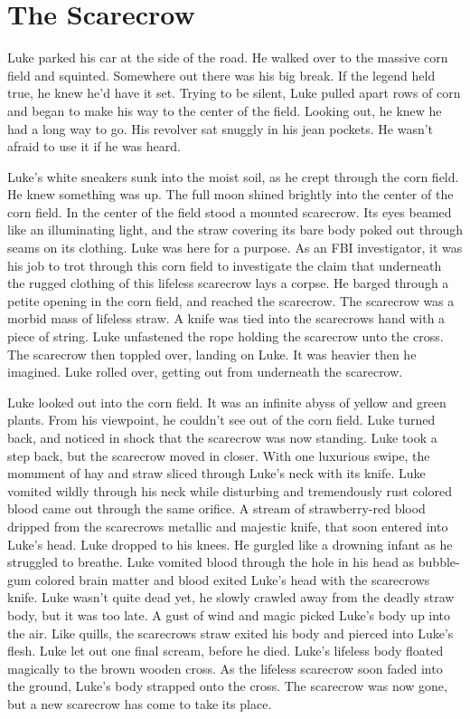 \chapter{The Scarecrow}


Luke parked his car at the side of the road. He walked over to the
massive corn field and squinted. Somewhere out there was his big
break. If the legend held true, he knew he'd have it set. Trying to
be silent, Luke pulled apart rows of corn and began to make his way
to the center of the field. Looking out, he knew he had a long way
to go. His revolver sat snuggly in his jean pockets. He wasn't
afraid to use it if he was heard.

Luke's white sneakers sunk into the moist soil, as he crept through the
corn field. He knew something was up. The full moon shined brightly
into the center of the corn field. In the center of the field stood
a mounted scarecrow. Its eyes beamed like an illuminating light,
and the straw covering its bare body poked out through seams on its
clothing. Luke was here for a purpose. As an FBI investigator, it
was his job to trot through this corn field to investigate the
claim that underneath the rugged clothing of this lifeless
scarecrow lays a corpse. He barged through a petite opening in the
corn field, and reached the scarecrow. The scarecrow was a morbid
mass of lifeless straw. A knife was tied into the scarecrows hand
with a piece of string. Luke unfastened the rope holding the
scarecrow unto the cross. The scarecrow then toppled over, landing
on Luke. It was heavier then he imagined. Luke rolled over, getting
out from underneath the scarecrow.

Luke looked out into the corn field. It was an infinite abyss of
yellow and green plants. From his viewpoint, he couldn't see out of
the corn field. Luke turned back, and noticed in shock that the
scarecrow was now standing. Luke took a step back, but the
scarecrow moved in closer. With one luxurious swipe, the monument
of hay and straw sliced through Luke's neck with its knife. Luke
vomited wildly through his neck while disturbing and tremendously
rust colored blood came out through the same orifice. A stream of
strawberry-red blood dripped from the scarecrows metallic and
majestic knife, that soon entered into Luke's head. Luke dropped to
his knees. He gurgled like a drowning infant as he struggled to
breathe. Luke vomited blood through the hole in his head as
bubble-gum colored brain matter and blood exited Luke's head with
the scarecrows knife. Luke wasn't quite dead yet, he slowly crawled
away from the deadly straw body, but it was too late. A gust of
wind and magic picked Luke's body up into the air. Like quills, the
scarecrows straw exited his body and pierced into Luke's flesh.
Luke let out one final scream, before he died. Luke's lifeless body
floated magically to the brown wooden cross. As the lifeless
scarecrow soon faded into the ground, Luke's body strapped onto the
cross. The scarecrow was now gone, but a new scarecrow has come to
take its place. 
 




